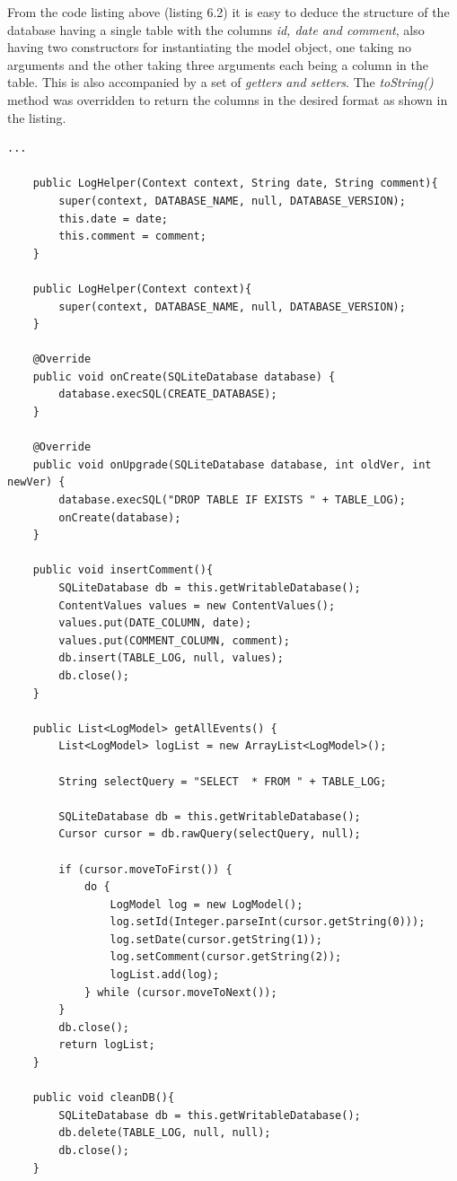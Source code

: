 From the code listing above (listing 6.2) it is easy to deduce the structure of the database having a single table with the columns {\it id, date and comment}, also having two constructors for instantiating the model object, one taking no arguments and the other taking three arguments each being a column in the table. This is also accompanied by a set of {\it getters and setters}. The {\it toString()} method was overridden to return the columns in the desired format as shown in the listing.
\newpage
\begin{lstlisting}[label=sqlite-helper,caption=Implementaion of the SQLiteOpenHelper] 
	...
	
	public LogHelper(Context context, String date, String comment){
		super(context, DATABASE_NAME, null, DATABASE_VERSION);
		this.date = date;
		this.comment = comment;
	}
	
	public LogHelper(Context context){
		super(context, DATABASE_NAME, null, DATABASE_VERSION);
	}
	
	@Override
	public void onCreate(SQLiteDatabase database) {
		database.execSQL(CREATE_DATABASE);
	}

	@Override
	public void onUpgrade(SQLiteDatabase database, int oldVer, int newVer) {
		database.execSQL("DROP TABLE IF EXISTS " + TABLE_LOG);
		onCreate(database);
	}
	
	public void insertComment(){
		SQLiteDatabase db = this.getWritableDatabase();
		ContentValues values = new ContentValues();
		values.put(DATE_COLUMN, date);
		values.put(COMMENT_COLUMN, comment);
		db.insert(TABLE_LOG, null, values);
		db.close();
	}
	
	public List<LogModel> getAllEvents() {
	    List<LogModel> logList = new ArrayList<LogModel>();

	    String selectQuery = "SELECT  * FROM " + TABLE_LOG;
	 
	    SQLiteDatabase db = this.getWritableDatabase();
	    Cursor cursor = db.rawQuery(selectQuery, null);
	 
	    if (cursor.moveToFirst()) {
	        do {
	            LogModel log = new LogModel();
	            log.setId(Integer.parseInt(cursor.getString(0)));
	            log.setDate(cursor.getString(1));
	            log.setComment(cursor.getString(2));
	            logList.add(log);
	        } while (cursor.moveToNext());
	    }
	    db.close();
	    return logList;
	}
	
	public void cleanDB(){
		SQLiteDatabase db = this.getWritableDatabase();
		db.delete(TABLE_LOG, null, null);
		db.close();
	}
\end{lstlisting}

